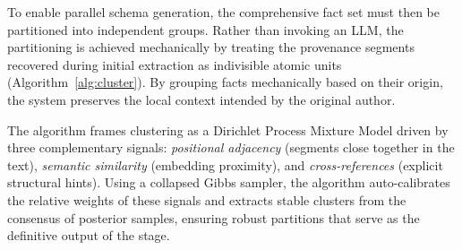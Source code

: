 To enable parallel schema generation, the comprehensive fact set must then be partitioned into independent groups. Rather than invoking an LLM, the partitioning is achieved mechanically by treating the provenance segments recovered during initial extraction as indivisible atomic units (Algorithm~\ref{alg:cluster}). By grouping facts mechanically based on their origin, the system preserves the local context intended by the original author.

The algorithm frames clustering as a Dirichlet Process Mixture Model driven by three complementary signals: \emph{positional adjacency} (segments close together in the text), \emph{semantic similarity} (embedding proximity), and \emph{cross-references} (explicit structural hints). Using a collapsed Gibbs sampler, the algorithm auto-calibrates the relative weights of these signals and extracts stable clusters from the consensus of posterior samples, ensuring robust partitions that serve as the definitive output of the stage.

